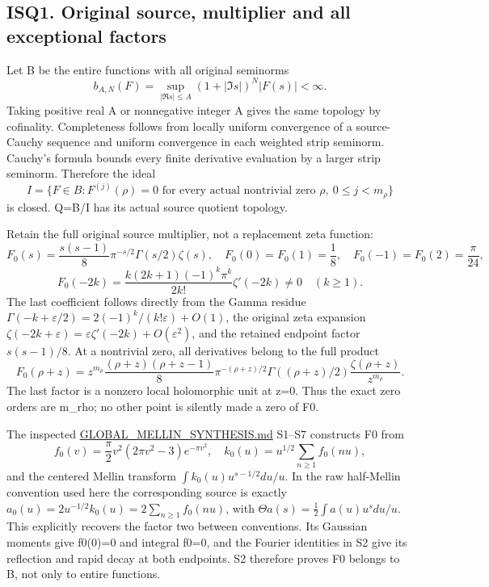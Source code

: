 \documentclass[
]{article}
\begin{document}
\subsection{ISQ1. Original source, multiplier and all exceptional factors}\label{isq1.-original-source-multiplier-and-all-exceptional-factors}

Let B be the entire functions with all original seminorms \[
b_{A,N}(F)=\sup_{|\Re s|\le A}(1+|\Im s|)^N|F(s)|<\infty.
\] Taking positive real A or nonnegative integer A gives the same topology by cofinality. Completeness follows from locally uniform convergence of a source-Cauchy sequence and uniform convergence in each weighted strip seminorm. Cauchy's formula bounds every finite derivative evaluation by a larger strip seminorm. Therefore the ideal \[
I=\{F\in B:F^{(j)}(\rho)=0\text{ for every actual nontrivial zero }\rho,
\ 0\le j<m_\rho\}
\] is closed. Q=B/I has its actual source quotient topology.

Retain the full original source multiplier, not a replacement zeta function: \[
F_0(s)=\frac{s(s-1)}8\pi^{-s/2}\Gamma(s/2)\zeta(s),
\quad F_0(0)=F_0(1)=\frac18,
\quad F_0(-1)=F_0(2)=\frac\pi{24},
\] \[
F_0(-2k)=\frac{k(2k+1)(-1)^k\pi^k}{2k!}\zeta'(-2k)\ne0
\quad(k\ge1).
\tag{ISQ1.1}
\] The last coefficient follows directly from the Gamma residue \(\Gamma(-k+\varepsilon/2)=2(-1)^k/(k!\varepsilon)+O(1)\), the original zeta expansion \(\zeta(-2k+\varepsilon)=\varepsilon\zeta'(-2k)+O(\varepsilon^2)\), and the retained endpoint factor \(s(s-1)/8\). At a nontrivial zero, all derivatives belong to the full product \[
F_0(\rho+z)=z^{m_\rho}\frac{(\rho+z)(\rho+z-1)}8
\pi^{-(\rho+z)/2}\Gamma((\rho+z)/2)
\frac{\zeta(\rho+z)}{z^{m_\rho}}.
\tag{ISQ1.2}
\] The last factor is a nonzero local holomorphic unit at z=0. Thus the exact zero orders are m\_rho; no other point is silently made a zero of F0.

The inspected \href{https://github.com/KokunoYumeto/zeta-function-research-reader/blob/96b02efaf4511d07f33de5ea4cfb10058e905d7e/workbenches/splitzero-tandem/continuations/20260924-cohomology-weight-and-character-lifts/gct-weight-control/proofs/GLOBAL_MELLIN_SYNTHESIS.md}{GLOBAL\_MELLIN\_SYNTHESIS.md} S1--S7 constructs F0 from \[
f_0(v)=\frac\pi2v^2(2\pi v^2-3)e^{-\pi v^2},\quad
k_0(u)=u^{1/2}\sum_{n\ge1}f_0(nu),
\] and the centered Mellin transform \(\int k_0(u)u^{s-1/2}du/u\). In the raw half-Mellin convention used here the corresponding source is exactly \(a_0(u)=2u^{-1/2}k_0(u)=2\sum_{n\ge1}f_0(nu)\), with \(\Theta a(s)=\frac12\int a(u)u^sdu/u\). This explicitly recovers the factor two between conventions. Its Gaussian moments give f0(0)=0 and integral f0=0, and the Fourier identities in S2 give its reflection and rapid decay at both endpoints. S2 therefore proves F0 belongs to B, not only to entire functions.
\end{document}
